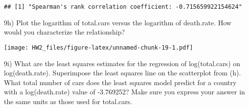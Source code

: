 \documentclass[
]{article}
\newenvironment{Shaded}{\begin{snugshade}}{\end{snugshade}}
\newcommand{\AttributeTok}[1]{\textcolor[rgb]{0.13,0.29,0.53}{#1}}
\newcommand{\CommentTok}[1]{\textcolor[rgb]{0.56,0.35,0.01}{\textit{#1}}}
\newcommand{\FunctionTok}[1]{\textcolor[rgb]{0.13,0.29,0.53}{\textbf{#1}}}
\newcommand{\NormalTok}[1]{#1}
\newcommand{\OtherTok}[1]{\textcolor[rgb]{0.56,0.35,0.01}{#1}}
\newcommand{\SpecialCharTok}[1]{\textcolor[rgb]{0.81,0.36,0.00}{\textbf{#1}}}
\newcommand{\StringTok}[1]{\textcolor[rgb]{0.31,0.60,0.02}{#1}}
\begin{document}
\begin{verbatim}
## [1] "Spearman's rank correlation coefficient: -0.715659922154624"
\end{verbatim}

9h) Plot the logarithm of total.cars versus the logarithm of death.rate.
How would you characterize the relationship?

\begin{Shaded}
\end{Shaded}

\texttt{[image: HW2\_files/figure-latex/unnamed-chunk-19-1.pdf]}

9i) What are the least squares estimates for the regression of
log(total.cars) on log(death.rate). Superimpose the least squares line
on the scatterplot from (h). What total number of cars does the least
squares model predict for a country with a log(death.rate) value of
-3.769252? Make sure you express your answer in the same units as those
used for total.cars.
\end{document}
